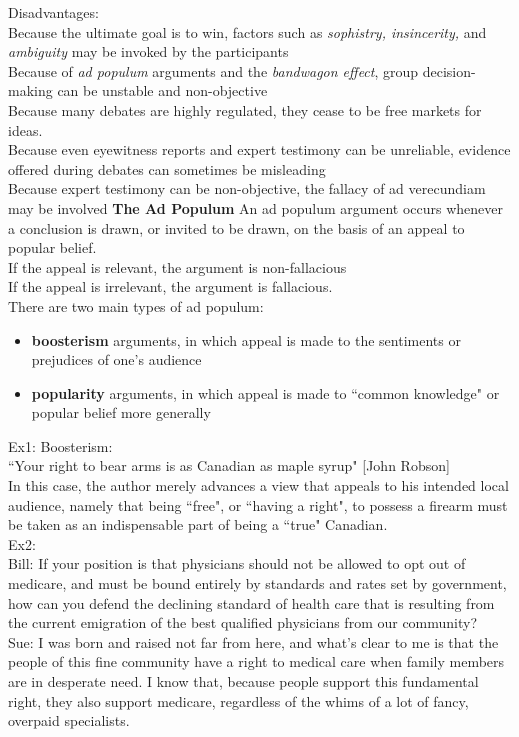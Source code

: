 \documentclass[11pt, fleqn]{article}
\begin{document}
Disadvantages:\\
Because the ultimate goal is to win, factors such as \textit{sophistry, insincerity,} and \textit{ambiguity} may be invoked by the participants\\
Because of \textit{ad populum} arguments and the \textit{bandwagon effect}, group decision-making can be unstable and non-objective\\
Because many debates are highly regulated, they cease to be free markets for ideas.\\
Because even eyewitness reports and expert testimony can be unreliable, evidence offered during debates can sometimes be misleading\\
Because expert testimony can be non-objective, the fallacy of ad verecundiam may be involved
\textbf{The Ad Populum}
An ad populum argument occurs whenever a conclusion is drawn, or invited to be drawn, on the basis of an appeal to popular belief.\\
If the appeal is relevant, the argument is non-fallacious\\
If the appeal is irrelevant, the argument is fallacious.\\
There are two main types of ad populum:\\
\begin{itemize}
    \item \textbf{boosterism} arguments, in which appeal is made to the sentiments or prejudices of one's audience
    \item \textbf{popularity} arguments, in which appeal is made to ``common knowledge" or popular belief more generally
\end{itemize}
Ex1: Boosterism:\\
``Your right to bear arms is as Canadian as maple syrup" [John Robson]\\
In this case, the author merely advances a view that appeals to his intended local audience, namely that being ``free", or ``having a right", to possess a firearm must be taken as an indispensable part of being a ``true" Canadian.\\

Ex2:\\
Bill: If your position is that physicians should not be allowed to opt out of medicare, and must be bound entirely by standards and rates set by government, how can you defend the declining standard of health care that is resulting from the current emigration of the best qualified physicians from our community?\\
Sue: I was born and raised not far from here, and what's clear to me is that the people of this fine community have a right to medical care when family members are in desperate need. I know that, because people support this fundamental right, they also support medicare, regardless of the whims of a lot of fancy, overpaid specialists.\\
\end{document}
